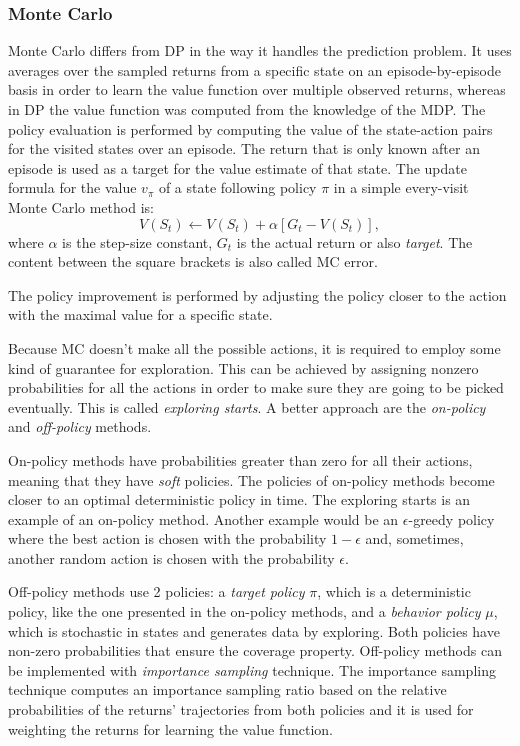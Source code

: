\subsubsection{Monte Carlo}
Monte Carlo differs from DP in the way it handles the prediction problem. It uses averages over the sampled returns from a specific state on an episode-by-episode basis in order to learn the value function over multiple observed returns, whereas in DP the value function was computed from the knowledge of the MDP. The policy evaluation is performed by computing the value of the state-action pairs for the visited states over an episode. The return that is only known after an episode is used as a target for the value estimate of that state. The update formula for the value $v_{\pi}$ of a state following policy $\pi$ in a simple every-visit Monte Carlo method is:
\begin{equation}\label{PolicyEvaluationMC}
V(S_{t})\leftarrow V(S_{t})+\alpha \left [ G_{t}-V(S_{t}) \right ],
\end{equation}
where $\alpha$ is the step-size constant, $G_{t}$ is the actual return or also \textit{target}. The content between the square brackets is also called MC error.

The policy improvement is performed by adjusting the policy closer to the action with the maximal value for a specific state.

Because MC doesn't make all the possible actions, it is required to employ some kind of guarantee for exploration. This can be achieved by assigning nonzero probabilities for all the actions in order to make sure they are going to be picked eventually. This is called \textit{exploring starts}. A better approach are the \textit{on-policy} and \textit{off-policy} methods. 

On-policy methods have probabilities greater than zero for all their actions, meaning that they have \textit{soft} policies. The policies of on-policy methods become closer to an optimal deterministic policy in time. The exploring starts is an example of an on-policy method. Another example would be an $\epsilon$-greedy policy where the best action is chosen with the probability $1-\epsilon$ and, sometimes, another random action is chosen with the probability $\epsilon$.

Off-policy methods use 2 policies: a \textit{target policy} $\pi$, which is a deterministic policy, like the one presented in the on-policy methods, and a \textit{behavior policy} $\mu$, which is stochastic in states and generates data by exploring. Both policies have non-zero probabilities that ensure the coverage property. Off-policy methods can be implemented with \textit{importance sampling} technique. The importance sampling technique computes an importance sampling ratio based on the relative probabilities of the returns' trajectories from both policies and it is used for weighting the returns for learning the value function.


